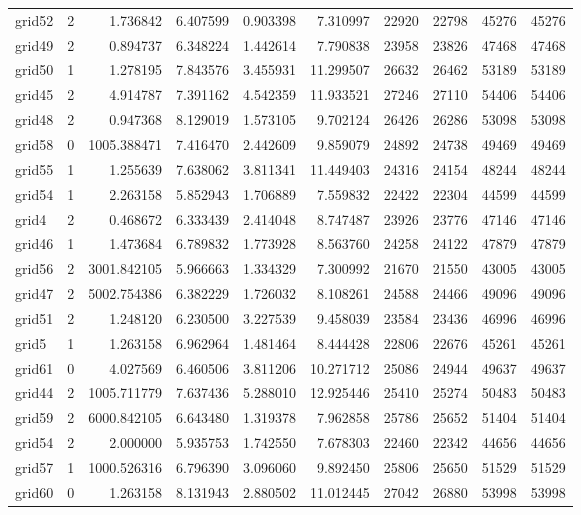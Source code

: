 \begin{longtable}{|l|r|r|r|r|r|r|r|r|r|}
grid52 & 2 & 1.736842 & 6.407599 & 0.903398 & 7.310997 & 22920 & 22798 & 45276 & 45276 \\
grid49 & 2 & 0.894737 & 6.348224 & 1.442614 & 7.790838 & 23958 & 23826 & 47468 & 47468 \\
grid50 & 1 & 1.278195 & 7.843576 & 3.455931 & 11.299507 & 26632 & 26462 & 53189 & 53189 \\
grid45 & 2 & 4.914787 & 7.391162 & 4.542359 & 11.933521 & 27246 & 27110 & 54406 & 54406 \\
grid48 & 2 & 0.947368 & 8.129019 & 1.573105 & 9.702124 & 26426 & 26286 & 53098 & 53098 \\
grid58 & 0 & 1005.388471 & 7.416470 & 2.442609 & 9.859079 & 24892 & 24738 & 49469 & 49469 \\
grid55 & 1 & 1.255639 & 7.638062 & 3.811341 & 11.449403 & 24316 & 24154 & 48244 & 48244 \\
grid54 & 1 & 2.263158 & 5.852943 & 1.706889 & 7.559832 & 22422 & 22304 & 44599 & 44599 \\
grid4 & 2 & 0.468672 & 6.333439 & 2.414048 & 8.747487 & 23926 & 23776 & 47146 & 47146 \\
grid46 & 1 & 1.473684 & 6.789832 & 1.773928 & 8.563760 & 24258 & 24122 & 47879 & 47879 \\
grid56 & 2 & 3001.842105 & 5.966663 & 1.334329 & 7.300992 & 21670 & 21550 & 43005 & 43005 \\
grid47 & 2 & 5002.754386 & 6.382229 & 1.726032 & 8.108261 & 24588 & 24466 & 49096 & 49096 \\
grid51 & 2 & 1.248120 & 6.230500 & 3.227539 & 9.458039 & 23584 & 23436 & 46996 & 46996 \\
grid5 & 1 & 1.263158 & 6.962964 & 1.481464 & 8.444428 & 22806 & 22676 & 45261 & 45261 \\
grid61 & 0 & 4.027569 & 6.460506 & 3.811206 & 10.271712 & 25086 & 24944 & 49637 & 49637 \\
grid44 & 2 & 1005.711779 & 7.637436 & 5.288010 & 12.925446 & 25410 & 25274 & 50483 & 50483 \\
grid59 & 2 & 6000.842105 & 6.643480 & 1.319378 & 7.962858 & 25786 & 25652 & 51404 & 51404 \\
grid54 & 2 & 2.000000 & 5.935753 & 1.742550 & 7.678303 & 22460 & 22342 & 44656 & 44656 \\
grid57 & 1 & 1000.526316 & 6.796390 & 3.096060 & 9.892450 & 25806 & 25650 & 51529 & 51529 \\
grid60 & 0 & 1.263158 & 8.131943 & 2.880502 & 11.012445 & 27042 & 26880 & 53998 & 53998 \\

\end{longtable}
